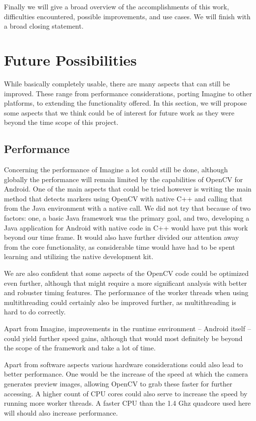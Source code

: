 Finally we will give a broad overview of the accomplishments of this work, difficulties encountered, possible improvements, and use cases.
We will finish with a broad closing statement.

\section{Future Possibilities}
\label{future}

While basically completely usable, there are many aspects that can still be improved.
These range from performance considerations, porting Imagine to other platforms, to extending the functionality offered.
In this section, we will propose some aspects that we think could be of interest for future work as they were beyond the time scope of this project.

\subsection{Performance}

Concerning the performance of Imagine a lot could still be done, although globally the performance will remain limited by the capabilities of OpenCV for Android.
One of the main aspects that could be tried however is writing the main method that detects markers using OpenCV with native C++ and calling that from the Java environment with a native call.
We did not try that because of two factors: one, a basic Java framework was the primary goal, and two, developing a Java application for Android with native code in C++ would have put this work beyond our time frame.
It would also have further divided our attention away from the core functionality, as considerable time would have had to be spent learning and utilizing the native development kit.

We are also confident that some aspects of the OpenCV code could be optimized even further, although that might require a more significant analysis with better and robuster timing features.
The performance of the worker threads when using multithreading could certainly also be improved further, as multithreading is hard to do correctly.

Apart from Imagine, improvements in the runtime environment – Android itself – could yield further speed gains, although that would most definitely be beyond the scope of the framework and take a lot of time.

Apart from software aspects various hardware considerations could also lead to better performance.
One would be the increase of the speed at which the camera generates preview images, allowing OpenCV to grab these faster for further accessing.
A higher count of CPU cores could also serve to increase the speed by running more worker threads.
A faster CPU than the 1.4 Ghz quadcore used here will should also increase performance.

